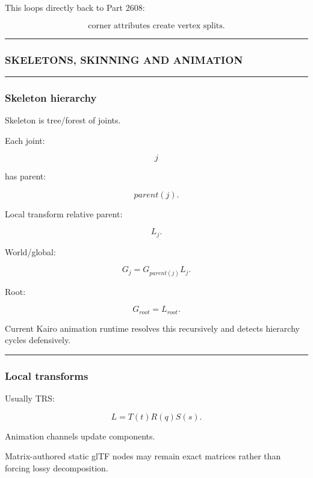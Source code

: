 This loops directly back to Part 2608:

\[
\boxed{
\text{corner attributes create vertex splits}.
}
\]

\begin{center}\rule{0.5\linewidth}{0.5pt}\end{center}

\subsubsection{SKELETONS, SKINNING AND ANIMATION}\label{skeletons-skinning-and-animation}

\begin{center}\rule{0.5\linewidth}{0.5pt}\end{center}

\subsubsection{Skeleton hierarchy}\label{skeleton-hierarchy}

Skeleton is tree/forest of joints.

Each joint:

\[
j
\]

has parent:

\[
parent(j).
\]

Local transform relative parent:

\[
L_j.
\]

World/global:

\[
\boxed{
G_j
=
G_{parent(j)}
L_j.
}
\]

Root:

\[
G_{root}=L_{root}.
\]

Current Kairo animation runtime resolves this recursively and detects hierarchy cycles defensively.

\begin{center}\rule{0.5\linewidth}{0.5pt}\end{center}

\subsubsection{Local transforms}\label{local-transforms}

Usually TRS:

\[
L=
T(t)
R(q)
S(s).
\]

Animation channels update components.

Matrix-authored static glTF nodes may remain exact matrices rather than forcing lossy decomposition.

